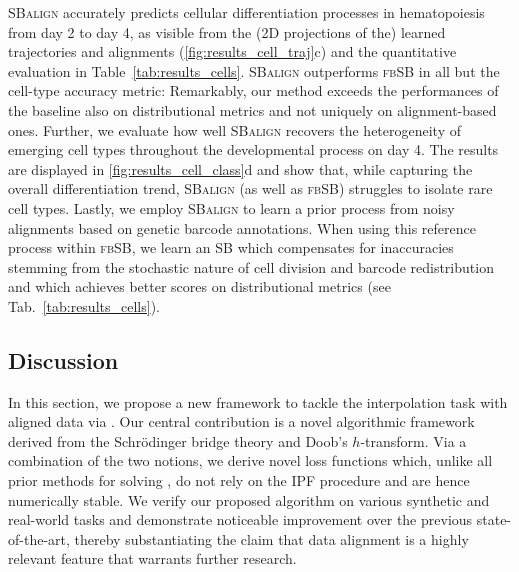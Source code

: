 \textsc{SBalign} accurately predicts cellular differentiation processes in hematopoiesis from day 2 to day 4, as visible from the (2D projections of the) learned trajectories and alignments (\cref{fig:results_cell_traj}c) and the quantitative evaluation in Table~\ref{tab:results_cells}. \textsc{SBalign} outperforms \textsc{fbSB} in all but the cell-type accuracy metric: Remarkably, our method exceeds the performances of the baseline also on distributional metrics and not uniquely on alignment-based ones. Further, we evaluate how well \textsc{SBalign} recovers the heterogeneity of emerging cell types throughout the developmental process on day 4. The results are displayed in \cref{fig:results_cell_class}d and show that, while capturing the overall differentiation trend, \textsc{SBalign} (as well as \textsc{fbSB}) struggles to isolate rare cell types.
Lastly, we employ \textsc{SBalign} to learn a prior process from noisy alignments based on genetic barcode annotations. When using this reference process within \textsc{fbSB}, we learn an SB which compensates for inaccuracies stemming from the stochastic nature of cell division and barcode redistribution and which achieves better scores on distributional metrics (see Tab.~\ref{tab:results_cells}).

\subsection{Discussion}

\vspace{-5pt}
In this section, we propose a new framework to tackle the interpolation task with aligned data via . Our central contribution is a novel algorithmic framework derived from the Schr\"odinger bridge theory and Doob's $h$-transform. Via a combination of the two notions, we derive novel loss functions which, unlike all prior methods for solving , do not rely on the \acrlong{IPF} procedure and are hence numerically stable. We verify our proposed algorithm on various synthetic and real-world tasks and demonstrate noticeable improvement over the previous state-of-the-art, thereby substantiating the claim that data alignment is a highly relevant feature that warrants further research.


